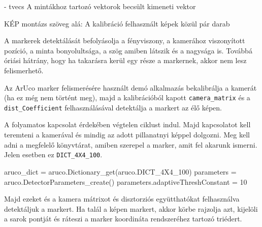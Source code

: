 - tvecs  A mintákhoz tartozó vektorok becsült kimeneti vektor


KÉP montázs
szöveg alá: A kalibráció felhasznált képek közül pár darab




A markerek detektálását befolyásolja a fényviszony, a kamerához viszonyított pozíció, a minta bonyolultsága, a szög amiben látszik és a nagysága is. Továbbá óriási hátrány, hogy ha takarásra kerül egy része a markernek, akkor nem lesz felismerhető.

Az ArUco marker felismerésére használt demó alkalmazás bekalibrálja a kamerát (ha ez még nem történt meg), majd a kalibrációból kapott \texttt{camera\_matrix} és a \texttt{dist\_Coefficient} felhasználásával detektálja a markert az élő képen.

A folyamatos kapcsolat érdekében végtelen ciklust indul. Majd kapcsolatot kell teremteni a kamerával és mindig az adott pillanatnyi képpel dolgozni. 
Meg kell adni a megfelelő könyvtárat, amiben szerepel a marker, amit fel akarunk ismerni. Jelen esetben ez \texttt{DICT\_4X4\_100}.
\begin{python}
aruco_dict = aruco.Dictionary_get(aruco.DICT_4X4_100)
parameters = aruco.DetectorParameters_create()
parameters.adaptiveThreshConstant = 10
\end{python}

Majd ezeket és a kamera mátrixot és disztorziós együtthatókat felhasználva detektáljuk a markert.
Ha talál a képen markert, akkor körbe rajzolja azt, kijelöli a sarok pontját és ráteszi a marker koordináta rendszeréhez tartozó triédert.
